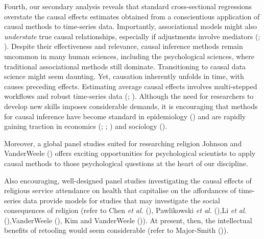 \documentclass[
  single column]{article}
\begin{document}
Fourth, our secondary analysis reveals that standard cross-sectional
regressions overstate the causal effects estimates obtained from a
conscientious application of causal methods to time-series data.
Importantly, associational models might also \emph{understate} true
causal relationships, especially if adjustments involve mediators
(;
). Despite
their effectiveness and relevance, causal inference methods remain
uncommon in many human sciences, including the psychological sciences,
where traditional associational methods still dominate. Transitioning to
causal data science might seem daunting. Yet, causation inherently
unfolds in time, with causes preceding effects. Estimating average
causal effects involves multi-stepped workflows and robust time-series
data (;
). Although the need for
researchers to develop new skills imposes considerable demands, it is
encouraging that methods for causal inference have become standard in
epidemiology () and are
rapidly gaining traction in economics
(;
;
) and sociology
().

Moreover, a global panel studies suited for researching religion Johnson
and VanderWeele () offers exciting
opportunities for psychological scientists to apply causal methods to
those psychological questions at the heart of our discipline.

Also encouraging, well-designed panel studies investigating the causal
effects of religious service attendance on health that capitalise on the
affordances of time-series data provide models for studies that may
investigate the social consequences of religion (refer to Chen \emph{et
al.} (), Pawlikowski \emph{et al.}
(),Li \emph{et al.}
(),VanderWeele
(),
Kim and VanderWeele ()). At
present, then, the intellectual benefits of retooling would seem
considerable (refer to Major-Smith
()).
\end{document}
